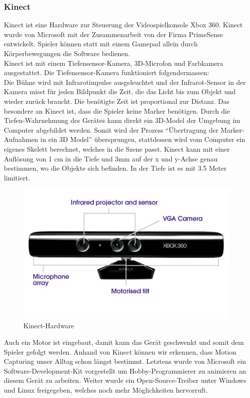 \subsubsection{Kinect}
\label{sec:kinect}
Kinect ist eine Hardware zur Steuerung der Videospielkonsole Xbox 360. Kinect wurde von Microsoft mit der Zusammenarbeit von der Firma PrimeSense entwickelt. Spieler können statt mit einem Gamepad allein durch Körperbewegungen die Software bedienen. \\
Kinect ist mit einem Tiefensensor-Kamera, 3D-Microfon und Farbkamera ausgestattet. Die Tiefensensor-Kamera funktioniert folgendermassen: \\
Die Bühne wird mit Infrarotimpulse ausgeleuchtet und der Infrarot-Sensor in der Kamera misst für jeden Bildpunkt die Zeit, die das Licht bis zum Objekt und wieder zurück braucht. Die benötigte Zeit ist proportional zur Distanz. Das besondere an Kinect ist, dass die Spieler keine Marker benötigen. Durch die Tiefen-Wahrnehmung des Gerätes kann direkt ein 3D-Model der Umgebung im Computer  abgebildet werden. Somit wird der Prozess ``Übertragung der Marker-Aufnahmen in ein 3D Model'' übersprungen, stattdessen wird vom Computer ein eigenes Skelett berechnet, welches in die Szene passt.  
Kinect kann mit einer Auflösung von 1 cm in die Tiefe und 3mm auf der x und y-Achse genau bestimmen, wo die Objekte sich befinden. In der Tiefe ist es mit 3.5 Meter limitiert. \\

\begin{figure}[hbtp]
\centering
\includegraphics[scale=0.5]{include/kinect.jpg}
\caption{Kinect-Hardware}
\end{figure}

Auch ein Motor ist eingebaut, damit kann das Gerät geschwenkt und somit dem Spieler gefolgt werden.
Anhand von Kinect können wir erkennen, dass Motion Capturing unser Alltag schon längst bestimmt. Letztens wurde von Microsoft ein Software-Development-Kit vorgestellt um Hobby-Programmierer zu animieren an diesem Gerät zu arbeiten. Weiter wurde ein Open-Source-Treiber unter Windows und Linux freigegeben, welches noch mehr Möglichkeiten hervorruft.

